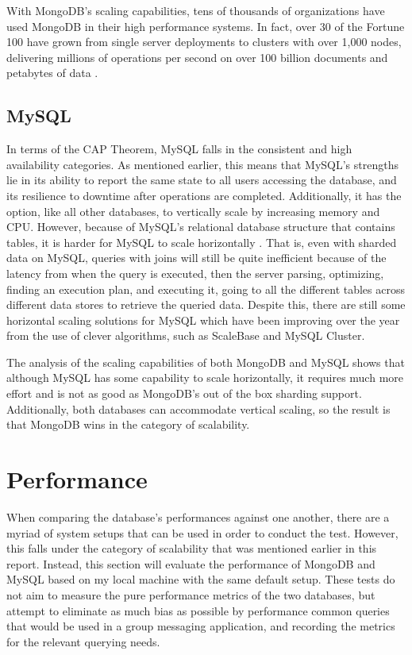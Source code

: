 \documentclass[12pt]{article}
\begin{document}
With MongoDB's scaling capabilities, tens of thousands of organizations have used MongoDB in their high performance systems. In fact, over 30 of the Fortune 100 have grown from single server deployments to clusters with over 1,000 nodes, delivering millions of operations per second on over 100 billion documents and petabytes of data \cite{mongodb_scale}.

\subsection{MySQL}

In terms of the CAP Theorem, MySQL falls in the consistent and high availability categories. As mentioned earlier, this means that MySQL's strengths lie in its ability to report the same state to all users accessing the database, and its resilience to downtime after operations are completed. Additionally, it has the option, like all other databases, to vertically scale by increasing memory and CPU. However, because of MySQL's relational database structure that contains tables, it is harder for MySQL to scale horizontally \cite{mysql_scale_issues}. That is, even with sharded data on MySQL, queries with joins will still be quite inefficient because of the latency from when the query is executed, then the server parsing, optimizing, finding an execution plan, and executing it, going to all the different tables across different data stores to retrieve the queried data. Despite this, there are still some horizontal scaling solutions for MySQL which have been improving over the year from the use of clever algorithms, such as ScaleBase and MySQL Cluster.

The analysis of the scaling capabilities of both MongoDB and MySQL shows that although MySQL has some capability to scale horizontally, it requires much more effort and is not as good as MongoDB's out of the box sharding support. Additionally, both databases can accommodate vertical scaling, so the result is that MongoDB wins in the category of scalability.


\section{Performance}

When comparing the database's performances against one another, there are a myriad of system setups that can be used in order to conduct the test. However, this falls under the category of scalability that was mentioned earlier in this report. Instead, this section will evaluate the performance of MongoDB and MySQL based on my local machine with the same default setup. These tests do not aim to measure the pure performance metrics of the two databases, but attempt to eliminate as much bias as possible by performance common queries that would be used in a group messaging application, and recording the metrics for the relevant querying needs. 
\end{document}
